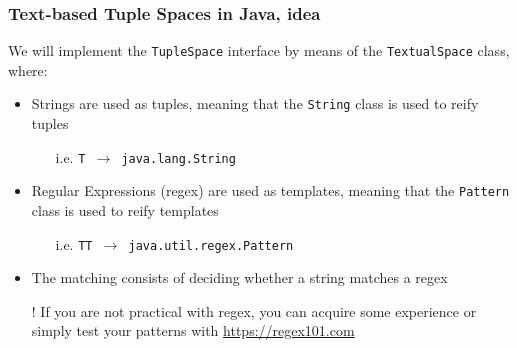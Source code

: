 \documentclass[presentation]{beamer}\mode<presentation>{\usetheme{AMSCesenaPurpleAndGold}}
\begin{document}
\begin{frame}%
\frametitle{Text-based Tuple Spaces in Java, idea}

We will implement the \texttt{TupleSpace} interface by means of the \texttt{\alert{Textual}Space} class, where:
%
\vfill
%
\begin{itemize}	
\item Strings are used as tuples, meaning that the \texttt{\alert{String}} class is used to reify tuples
%
\begin{itemize}
\item[i.e.] \texttt{T $\rightarrow$ java.lang.\alert{String}}
\end{itemize}

\vfill

\item Regular Expressions (regex) are used as templates, meaning that the \texttt{\alert{Pattern}} class is used to reify templates
%
\begin{itemize}
\item[i.e.] \texttt{TT $\rightarrow$ java.util.regex.\alert{Pattern}}
\end{itemize}

\vfill

\item The matching consists of \alert{deciding} whether a string matches a regex

\vfill

\item[!] If you are not practical with regex, you can acquire some experience or simply test your patterns with \url{https://regex101.com}
\end{itemize}

\end{frame}

\newcommand{\bs}[1]{\textbackslash{}#1}
\end{document}
